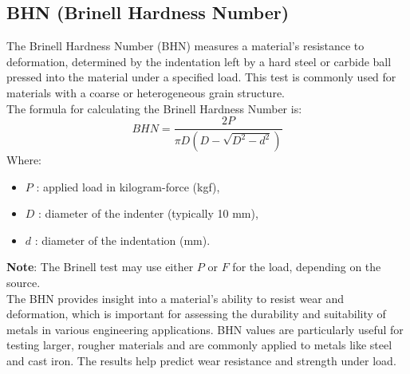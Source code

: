 \documentclass{article}
\begin{document}
\newpage
\subsection{BHN (Brinell Hardness Number)}
The Brinell Hardness Number (BHN) measures a material's resistance to deformation, determined by the indentation left by a hard steel or carbide ball pressed into the material under a specified load. This test is commonly used for materials with a coarse or heterogeneous grain structure.\\[1em]
The formula for calculating the Brinell Hardness Number is:
\begin{equation}
    BHN = \frac{2P}{\pi D (D - \sqrt{D^2 - d^2})}
\end{equation}
Where:
\begin{itemize}[itemsep=-1mm]
    \item \( P \) : applied load in kilogram-force (kgf),
    \item \( D \) : diameter of the indenter (typically 10 mm),
    \item \( d \) : diameter of the indentation (mm).
\end{itemize}
\textbf{Note}: The Brinell test may use either $P$ or $F$ for the load, depending on the source.\\ 
The BHN provides insight into a material's ability to resist wear and deformation, which is important for assessing the durability and suitability of metals in various engineering applications. BHN values are particularly useful for testing larger, rougher materials and are commonly applied to metals like steel and cast iron. The results help predict wear resistance and strength under load.
\end{document}
